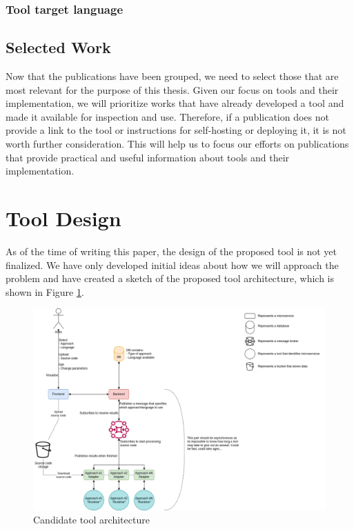 \documentclass[conference]{IEEEtran}
\begin{document}
\subsubsection{Tool target language}

\subsection{Selected Work}

Now that the publications have been grouped, we need to select those that are
most relevant for the purpose of this thesis. Given our focus on tools and
their implementation, we will prioritize works that have already developed a
tool and made it available for inspection and use. Therefore, if a publication
does not provide a link to the tool or instructions for self-hosting or
deploying it, it is not worth further consideration. This will help us to focus
our efforts on publications that provide practical and useful information about
tools and their implementation.

\section{Tool Design}

As of the time of writing this paper, the design of the proposed tool is not
yet finalized. We have only developed initial ideas about how we will approach
the problem and have created a sketch of the proposed tool architecture, which
is shown in Figure \ref{fig:tool-architecture}.

\begin{figure}[!htb]
  \caption{Candidate tool architecture}
  \label{fig:tool-architecture}
  \centering
  \includegraphics[width=\columnwidth]{thesis-architecture.drawio}
\end{figure}
\end{document}

